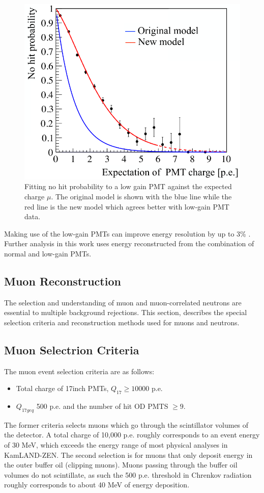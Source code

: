 \begin{figure}[htb]
	\centering
	\includegraphics[scale=0.4]{no-hitprob.png}
	\caption{Fitting no hit probability to a low gain PMT against the expected charge $\mu$. The original model is shown with the blue line while the red line is the new model which agrees better with low-gain PMT data.}
	\label{fig:nohit_prob}
\end{figure}

Making use of the low-gain PMTs can improve energy resolution by up to 3\% \cite{karino_master}. Further analysis in this work uses energy reconstructed from the combination of normal and low-gain PMTs.

\subsection{Muon Reconstruction}
The selection and understanding of muon and muon-correlated neutrons are essential to multiple background rejections. This section, describes the special selection criteria and reconstruction methods used for muons and neutrons.
\subsection*{Muon Selectrion Criteria}
The muon event selection criteria are as follows:
\begin{itemize}
	\item Total charge of 17inch PMTs, $Q_{17}\geq 10000$ p.e.
	\item $Q_{17geq}$ 500 p.e. and the number of hit OD PMTS $\geq 9$.
\end{itemize}
The former criteria selects muons which go through the scintillator volumes of the detector. A total charge of 10,000 p.e. roughly corresponds to an event energy of 30 MeV, which exceeds the energy range of most physical analyses in KamLAND-ZEN. The second selection is for muons that only deposit energy in the outer buffer oil (clipping muons). Muons passing through the buffer oil volumes do not scintillate, as such the 500 p.e. threshold in Chrenkov radiation roughly corresponds to about 40 MeV of energy deposition.
